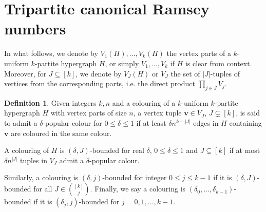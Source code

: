 \documentclass[11pt]{article}
\theoremstyle{plain}
\theoremstyle{definition}
\newtheorem{definition}{Definition}
\begin{document}
\section{Tripartite canonical Ramsey numbers}\label{sec-tri-erado}

In what follows, we denote by $V_1(H),\dots,V_k(H)$ the vertex parts of a $k$-uniform $k$-partite hypergraph $H$, or simply $V_1,\dots,V_k$ if $H$ is clear from context. Moreover, for $J\subseteq[k]$, we denote by $V_J(H)$ or $V_J$ the set of $|J|$-tuples of vertices from the corresponding parts, i.e. the direct product $\prod_{j\in J} V_j$.

\begin{definition}\label{def-bounded}
    Given integers $k,n$ and a colouring of a $k$-uniform $k$-partite hypergraph $H$ with vertex parts of size $n$, a vertex tuple $\mathbf{v}\in V_J$, $J\subsetneq [k]$, is said to admit a $\delta$-popular colour for $0\le \delta\le 1$ if at least $\delta n^{k-|J|}$ edges in $H$ containing $\mathbf{v}$ are coloured in the same colour.
    
    A colouring of $H$ is $(\delta,J)$-bounded for real $\delta$, $0\le \delta\le 1$ and $J\subsetneq[k]$ if at most $\delta n^{|J|}$ tuples in $V_J$ admit a $\delta$-popular colour.
    
    Similarly, a colouring is $(\delta,j)$-bounded for integer $0\le j\le k-1$ if it is $(\delta,J)$-bounded for all $J\in\binom{[k]}{j}$. Finally, we say a colouring is $(\delta_0,\dots,\delta_{k-1})$-bounded if it is $(\delta_j,j)$-bounded for $j=0,1,\dots,k-1$.
\end{definition}
\end{document}
